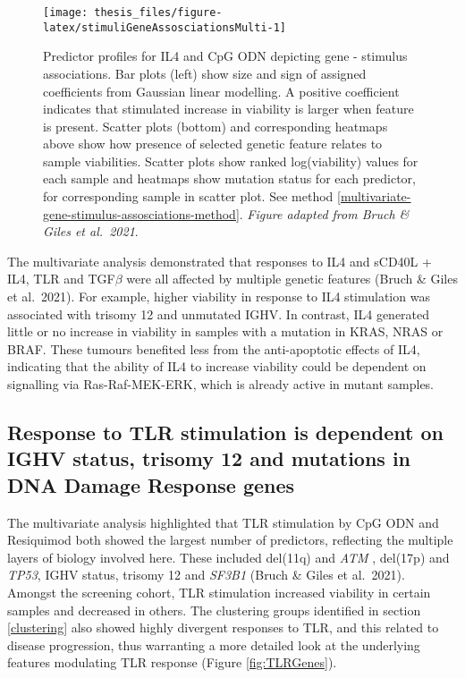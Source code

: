 \documentclass[11pt, a4paper, twosided]{book}
\begin{document}
\begin{figure}

{\centering \texttt{[image: thesis\_files/figure-latex/stimuliGeneAssosciationsMulti-1]} 

}

\caption{Predictor profiles for IL4 and CpG ODN depicting gene - stimulus associations. Bar plots (left) show size and sign of assigned coefficients from Gaussian linear modelling. A positive coefficient indicates that stimulated increase in viability is larger when feature is present. Scatter plots (bottom) and corresponding heatmaps above show how presence of selected genetic feature relates to sample viabilities. Scatter plots show ranked log(viability) values for each sample and heatmaps show mutation status for each predictor, for corresponding sample in scatter plot. See method \ref{multivariate-gene-stimulus-assosciations-method}. \emph{Figure adapted from Bruch \& Giles et al.~2021}.}\label{fig:stimuliGeneAssosciationsMulti}
\end{figure}
The multivariate analysis demonstrated that responses to IL4 and sCD40L + IL4, TLR and TGF\(\beta\) were all affected by multiple genetic features (Bruch \& Giles et al.~2021). For example, higher viability in response to IL4 stimulation was associated with trisomy 12 and unmutated IGHV. In contrast, IL4 generated little or no increase in viability in samples with a mutation in KRAS, NRAS or BRAF. These tumours benefited less from the anti-apoptotic effects of IL4, indicating that the ability of IL4 to increase viability could be dependent on signalling via Ras-Raf-MEK-ERK, which is already active in mutant samples.

\hypertarget{response-to-tlr-stimulation-is-dependent-on-ighv-status-trisomy-12-and-mutations-in-dna-damage-response-genes}{%
\subsection{Response to TLR stimulation is dependent on IGHV status, trisomy 12 and mutations in DNA Damage Response genes}\label{response-to-tlr-stimulation-is-dependent-on-ighv-status-trisomy-12-and-mutations-in-dna-damage-response-genes}}

The multivariate analysis highlighted that TLR stimulation by CpG ODN and Resiquimod both showed the largest number of predictors, reflecting the multiple layers of biology involved here. These included del(11q) and \emph{ATM} , del(17p) and \emph{TP53}, IGHV status, trisomy 12 and \emph{SF3B1} (Bruch \& Giles et al.~2021). Amongst the screening cohort, TLR stimulation increased viability in certain samples and decreased in others. The clustering groups identified in section \ref{clustering} also showed highly divergent responses to TLR, and this related to disease progression, thus warranting a more detailed look at the underlying features modulating TLR response (Figure \ref{fig:TLRGenes}).
\end{document}
